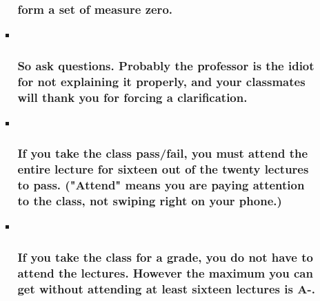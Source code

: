 \documentclass[11pt]{article}
\begin{document}
\begin{itemize}
\begin{itemize}
\begin{itemize}
      \subsubsection{form a set of measure
      zero.}\label{form-a-set-of-measure-zero.}
    \item ~
      \subsubsection{So ask questions. Probably the professor is the
      idiot for not explaining it properly, and your classmates will
      thank you for forcing a
      clarification.}\label{so-ask-questions.-probably-the-professor-is-the-idiot-for-not-explaining-it-properly-and-your-classmates-will-thank-you-for-forcing-a-clarification.}
    \item ~
      \subsubsection{If you take the class pass/fail, you must attend
      the entire lecture for sixteen out of the twenty lectures to pass.
      ("Attend" means you are paying attention to the class, not swiping
      right on your
      phone.)}\label{if-you-take-the-class-passfail-you-must-attend-the-entire-lecture-for-sixteen-out-of-the-twenty-lectures-to-pass.-attend-means-you-are-paying-attention-to-the-class-not-swiping-right-on-your-phone.}
    \item ~
      \subsubsection{If you take the class for a grade, you do not have
      to attend the lectures. However the maximum you can get without
      attending at least sixteen lectures is
      A-.}\label{if-you-take-the-class-for-a-grade-you-do-not-have-to-attend-the-lectures.-however-the-maximum-you-can-get-without-attending-at-least-sixteen-lectures-is-a-.}
    \end{itemize}
  \end{itemize}
\end{itemize}
\end{document}
